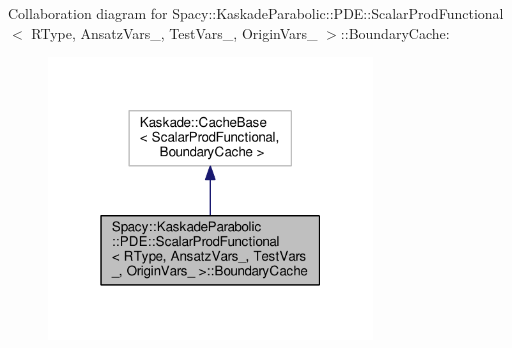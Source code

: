 Collaboration diagram for Spacy\-:\-:Kaskade\-Parabolic\-:\-:P\-D\-E\-:\-:Scalar\-Prod\-Functional$<$ R\-Type, Ansatz\-Vars\-\_\-, Test\-Vars\-\_\-, Origin\-Vars\-\_\- $>$\-:\-:Boundary\-Cache\-:
\nopagebreak
\begin{figure}[H]
\begin{center}
\leavevmode
\includegraphics[width=244pt]{classSpacy_1_1KaskadeParabolic_1_1PDE_1_1ScalarProdFunctional_1_1BoundaryCache__coll__graph}
\end{center}
\end{figure}
